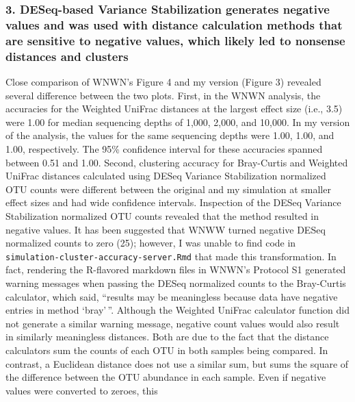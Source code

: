 \documentclass[
]{article}
\begin{document}
\hypertarget{deseq-based-variance-stabilization-generates-negative-values-and-was-used-with-distance-calculation-methods-that-are-sensitive-to-negative-values-which-likely-led-to-nonsense-distances-and-clusters}{%
\subsubsection{3. DESeq-based Variance Stabilization generates negative
values and was used with distance calculation methods that are sensitive
to negative values, which likely led to nonsense distances and
clusters}\label{deseq-based-variance-stabilization-generates-negative-values-and-was-used-with-distance-calculation-methods-that-are-sensitive-to-negative-values-which-likely-led-to-nonsense-distances-and-clusters}}

Close comparison of WNWN's Figure 4 and my version (Figure 3) revealed
several difference between the two plots. First, in the WNWN analysis,
the accuracies for the Weighted UniFrac distances at the largest effect
size (i.e., 3.5) were 1.00 for median sequencing depths of 1,000, 2,000,
and 10,000. In my version of the analysis, the values for the same
sequencing depths were 1.00, 1.00, and 1.00, respectively. The 95\%
confidence interval for these accuracies spanned between 0.51 and 1.00.
Second, clustering accuracy for Bray-Curtis and Weighted UniFrac
distances calculated using DESeq Variance Stabilization normalized OTU
counts were different between the original and my simulation at smaller
effect sizes and had wide confidence intervals. Inspection of the DESeq
Variance Stabilization normalized OTU counts revealed that the method
resulted in negative values. It has been suggested that WNWW turned
negative DESeq normalized counts to zero (25); however, I was unable to
find code in \texttt{simulation-cluster-accuracy-server.Rmd} that made
this transformation. In fact, rendering the R-flavored markdown files in
WNWN's Protocol S1 generated warning messages when passing the DESeq
normalized counts to the Bray-Curtis calculator, which said, ``results
may be meaningless because data have negative entries in method
`bray'\,''. Although the Weighted UniFrac calculator function did not
generate a similar warning message, negative count values would also
result in similarly meaningless distances. Both are due to the fact that
the distance calculators sum the counts of each OTU in both samples
being compared. In contrast, a Euclidean distance does not use a similar
sum, but sums the square of the difference between the OTU abundance in
each sample. Even if negative values were converted to zeroes, this
\end{document}
